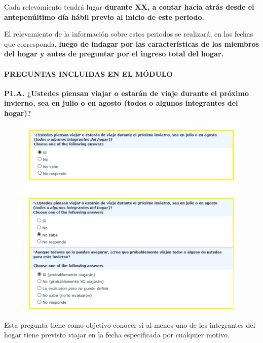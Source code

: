 \documentclass[
  openany]{book}
\begin{document}
Cada relevamiento tendrá lugar \textbf{durante XX, a contar hacia atrás desde el antepenúltimo día hábil previo al inicio de este periodo.}

El relevamiento de la información sobre estos periodos se realizará, en las fechas que corresponda, \textbf{luego de indagar por las características de los miembros del hogar y antes de preguntar por el ingreso total del hogar.}

\hypertarget{preguntas-incluidas-en-el-muxf3dulo}{%
\paragraph{\texorpdfstring{\textbf{PREGUNTAS INCLUIDAS EN EL MÓDULO}}{PREGUNTAS INCLUIDAS EN EL MÓDULO}}\label{preguntas-incluidas-en-el-muxf3dulo}}

\textbf{P1.A. ¿Ustedes piensan viajar o estarán de viaje durante el próximo invierno, sea en julio o en agosto (todos o algunos integrantes del hogar)?}

\begin{figure}

{\centering \includegraphics[width=1\linewidth]{imagenes/figura6-128} 

}

\end{figure}

Esta pregunta tiene como objetivo conocer si al menos uno de los integrantes del hogar tiene previsto viajar en la fecha especificada por cualquier motivo.
\end{document}
